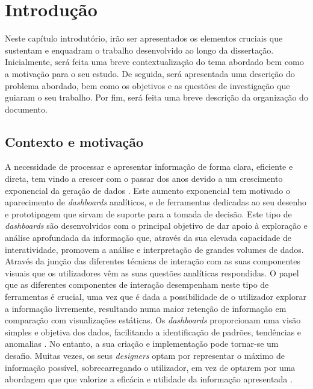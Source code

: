 
%

\chapter{Introdução}
\label{cha:introducao}

Neste capítulo introdutório, irão ser apresentados os elementos cruciais que sustentam e enquadram o trabalho desenvolvido ao longo da dissertação. Inicialmente, será feita uma breve contextualização do tema abordado bem como a motivação para o seu estudo. De seguida, será apresentada uma descrição do problema abordado, bem como os objetivos e as questões de investigação que guiaram o seu trabalho. Por fim, será feita uma breve descrição da organização do documento.

\section{Contexto e motivação}
\label{sec:cont_e_motiv}

A necessidade de processar e apresentar informação de forma clara, eficiente e direta, tem vindo a crescer com o passar dos anos devido a um crescimento exponencial da geração de dados \cite{kitchin2014data}. Este aumento exponencial tem motivado o aparecimento de \textit{dashboards} analíticos, e de ferramentas dedicadas ao seu desenho e prototipagem que sirvam de suporte para a tomada de decisão. Este tipo de \textit{dashboards} são desenvolvidos com o principal objetivo de dar apoio à exploração e análise aprofundada da informação que, através da sua elevada capacidade de interatividade, promovem a análise e interpretação de grandes volumes de dados. Através da junção das diferentes técnicas de interação com as suas componentes visuais que os utilizadores vêm as suas questões analíticas respondidas. O papel que as diferentes componentes de interação desempenham neste tipo de ferramentas é crucial, uma vez que é dada a possibilidade de o utilizador explorar a informação livremente, resultando numa maior retenção de informação em comparação com visualizações estáticas. Os \textit{dashboards} proporcionam uma visão simples e objetiva dos dados, facilitando a identificação de padrões, tendências e anomalias \cite{few2006information}. No entanto, a sua criação e implementação pode tornar-se um desafio. Muitas vezes, os seus \textit{designers} optam por representar o máximo de informação possível, sobrecarregando o utilizador, em vez de optarem por uma abordagem que que valorize a eficácia e utilidade da informação apresentada \cite{eckerson2010performance}.

